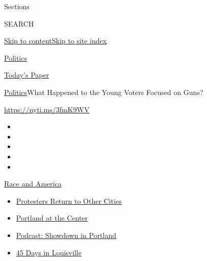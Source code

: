 Sections

SEARCH

\protect\hyperlink{site-content}{Skip to
content}\protect\hyperlink{site-index}{Skip to site index}

\href{https://www.nytimes3xbfgragh.onion/section/politics}{Politics}

\href{https://myaccount.nytimes3xbfgragh.onion/auth/login?response_type=cookie\&client_id=vi}{}

\href{https://www.nytimes3xbfgragh.onion/section/todayspaper}{Today's
Paper}

\href{/section/politics}{Politics}\textbar{}What Happened to the Young
Voters Focused on Guns?

\url{https://nyti.ms/3fmK9WV}

\begin{itemize}
\item
\item
\item
\item
\item
\end{itemize}

\href{https://www.nytimes3xbfgragh.onion/news-event/george-floyd-protests-minneapolis-new-york-los-angeles?action=click\&pgtype=Article\&state=default\&region=TOP_BANNER\&context=storylines_menu}{Race
and America}

\begin{itemize}
\tightlist
\item
  \href{https://www.nytimes3xbfgragh.onion/2020/07/26/us/protests-portland-seattle-trump.html?action=click\&pgtype=Article\&state=default\&region=TOP_BANNER\&context=storylines_menu}{Protesters
  Return to Other Cities}
\item
  \href{https://www.nytimes3xbfgragh.onion/2020/07/24/us/portland-oregon-protests-white-race.html?action=click\&pgtype=Article\&state=default\&region=TOP_BANNER\&context=storylines_menu}{Portland
  at the Center}
\item
  \href{https://www.nytimes3xbfgragh.onion/2020/07/23/podcasts/the-daily/portland-protests.html?action=click\&pgtype=Article\&state=default\&region=TOP_BANNER\&context=storylines_menu}{Podcast:
  Showdown in Portland}
\item
  \href{https://www.nytimes3xbfgragh.onion/interactive/2020/07/16/us/black-lives-matter-protests-louisville-breonna-taylor.html?action=click\&pgtype=Article\&state=default\&region=TOP_BANNER\&context=storylines_menu}{45
  Days in Louisville}
\end{itemize}

